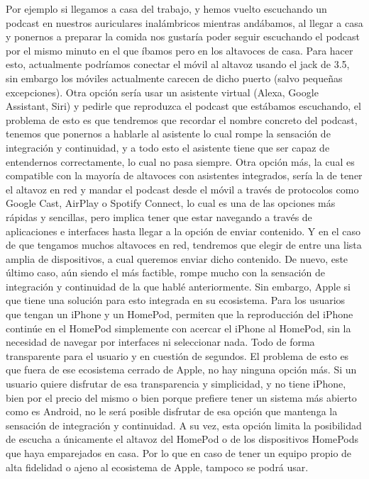 Por ejemplo si llegamos a casa del trabajo, y hemos vuelto escuchando un podcast en nuestros auriculares inalámbricos mientras andábamos, al llegar a casa y ponernos a preparar la comida nos gustaría poder seguir escuchando el podcast por el mismo minuto en el que íbamos pero en los altavoces de casa. Para hacer esto, actualmente podríamos conectar el móvil al altavoz usando el jack de 3.5, sin embargo los móviles actualmente carecen de dicho puerto (salvo pequeñas excepciones). Otra opción sería usar un asistente virtual (Alexa, Google Assistant, Siri) y pedirle que reproduzca el podcast que estábamos escuchando, el problema de esto es que tendremos que recordar el nombre concreto del podcast, tenemos que ponernos a hablarle al asistente lo cual rompe la sensación de integración y continuidad, y a todo esto el asistente tiene que ser capaz de entendernos correctamente, lo cual no pasa siempre. Otra opción más, la cual es compatible con la mayoría de altavoces con asistentes integrados, sería la de tener el altavoz en red y mandar el podcast desde el móvil a través de protocolos como Google Cast, AirPlay o Spotify Connect, lo cual es una de las opciones más rápidas y sencillas, pero implica tener que estar navegando a través de aplicaciones e interfaces hasta llegar a la opción de enviar contenido. Y en el caso de que tengamos muchos altavoces en red, tendremos que elegir de entre una lista amplia de dispositivos, a cual queremos enviar dicho contenido. De nuevo, este último caso, aún siendo el más factible, rompe mucho con la sensación de integración y continuidad de la que hablé anteriormente. Sin embargo, Apple si que tiene una solución para esto integrada en su ecosistema. Para los usuarios que tengan un iPhone y un HomePod, permiten que la reproducción del iPhone continúe en el HomePod simplemente con acercar el iPhone al HomePod, sin la necesidad de navegar por interfaces ni seleccionar nada. Todo de forma transparente para el usuario y en cuestión de segundos. El problema de esto es que fuera de ese ecosistema cerrado de Apple, no hay ninguna opción más. Si un usuario quiere disfrutar de esa transparencia y simplicidad, y no tiene iPhone, bien por el precio del mismo o bien porque prefiere tener un sistema más abierto como es Android, no le será posible disfrutar de esa opción que mantenga la sensación de integración y continuidad. A su vez, esta opción limita la posibilidad de escucha a únicamente el altavoz del HomePod o de los dispositivos HomePods que haya emparejados en casa. Por lo que en caso de tener un equipo propio de alta fidelidad o ajeno al ecosistema de Apple, tampoco se podrá usar.\\

